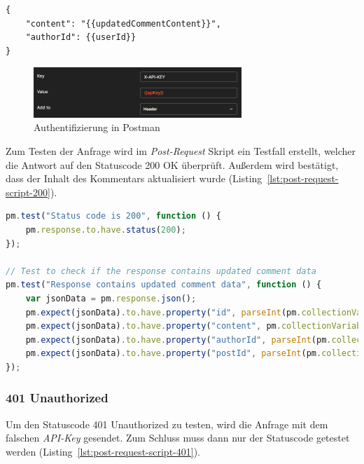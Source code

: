\begin{lstlisting}[caption=Request Body für die Bearbeitung eines Kommentars,label=lst:request-body-200]
{
    "content": "{{updatedCommentContent}}",
    "authorId": {{userId}}
}
\end{lstlisting}

\begin{figure}[htpb]
    \centering
    \includegraphics[width=0.7\textwidth]{Graphics/postmanauthscreen.png}
    \caption{Authentifizierung in Postman}
    \label{fig:authorization-postman}
\end{figure}

Zum Testen der Anfrage wird im \textit{Post-Request} Skript ein Testfall erstellt, welcher die Antwort auf den Statuscode 200 OK überprüft. Außerdem wird bestätigt, 
dass der Inhalt des Kommentars aktualisiert wurde (Listing~\ref{lst:post-request-script-200}). 

\begin{lstlisting}[language=JavaScript, caption=\textit{Post-Request} Skript für die Bearbeitung eines Kommentars,label=lst:post-request-script-200]
pm.test("Status code is 200", function () {
    pm.response.to.have.status(200);
});

// Test to check if the response contains updated comment data
pm.test("Response contains updated comment data", function () {
    var jsonData = pm.response.json();
    pm.expect(jsonData).to.have.property("id", parseInt(pm.collectionVariables.get("commentId")));
    pm.expect(jsonData).to.have.property("content", pm.collectionVariables.get("updatedCommentContent"));
    pm.expect(jsonData).to.have.property("authorId", parseInt(pm.collectionVariables.get("userId")));
    pm.expect(jsonData).to.have.property("postId", parseInt(pm.collectionVariables.get("postId")));
});
\end{lstlisting}

\subsubsection*{401 Unauthorized}

Um den Statuscode 401 Unauthorized zu testen, wird die Anfrage mit dem falschen \textit{\ac{API}-Key} gesendet. Zum Schluss muss dann nur der Statuscode getestet werden (Listing~\ref{lst:post-request-script-401}).

